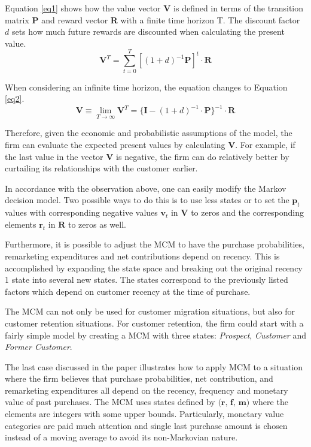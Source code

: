 \documentclass[11pt]{article}
\begin{document}
Equation \ref{eq1} shows how the value vector \textbf{V} is defined in terms of the transition matrix \textbf{P} and reward vector \textbf{R} with a finite time horizon T.
The discount factor $d$ sets how much future rewards are discounted when calculating the present value.
\begin{equation}\label{eq1}
\textbf{V}^T = \sum_{t=0}^T  [(1 + d)^{-1} \textbf{P}]^t \cdot \textbf{R}
\end{equation}

When considering an infinite time horizon, the equation changes to Equation \ref{eq2}.
\begin{equation}\label{eq2}
\textbf{V} \equiv \lim_{T \rightarrow \infty} \textbf{V}^T = \{\textbf{I} - (1 + d)^{-1} \cdot \textbf{P} \}^{-1} \cdot \textbf{R}
\end{equation}


Therefore, given the economic and probabilistic assumptions of the model, the firm can evaluate the expected present values by calculating $\textbf{V}$. For example, if the last value in the vector $\textbf{V}$ is negative, the firm can do relatively better by curtailing its relationships with the customer earlier.

In accordance with the observation above, one can easily modify the Markov decision model. Two possible ways to do this is to use less states or to set the $\textbf{p}_t$ values with corresponding negative values $\textbf{v}_t$ in $\textbf{V}$ to zeros and the corresponding elements $\textbf{r}_t$ in $\textbf{R}$ to zeros as well.%

Furthermore, it is possible to  adjust the MCM to have the purchase probabilities, remarketing expenditures and net contributions depend on recency. 
This is accomplished by expanding the state space and breaking out the original recency 1 state into several new states. 
The states correspond to the previously listed factors which depend on customer recency at the time of purchase. 

The MCM can not only be used for customer migration situations, but also for customer retention situations. For customer retention, the firm could start with a fairly simple model by creating a MCM with three states:  \textit{Prospect}, \textit{Customer} and \textit{Former Customer}. %

The last case discussed in the paper illustrates how to apply MCM to a situation where the firm believes that purchase probabilities, net contribution, and remarketing expenditures all depend on the recency, frequency and monetary value of past purchases. The MCM uses states defined by $\textbf{(r, f, m)}$ where the elements are integers with some upper bounds. Particularly, monetary value categories are paid much attention and single last purchase amount is chosen instead of a moving average to avoid its non-Markovian nature.
\end{document}
